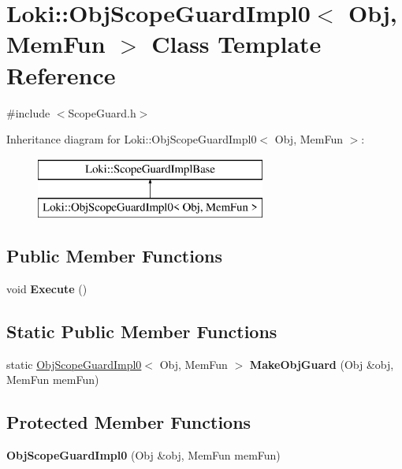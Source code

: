 \hypertarget{classLoki_1_1ObjScopeGuardImpl0}{}\section{Loki\+:\+:Obj\+Scope\+Guard\+Impl0$<$ Obj, Mem\+Fun $>$ Class Template Reference}
\label{classLoki_1_1ObjScopeGuardImpl0}


{\ttfamily \#include $<$Scope\+Guard.\+h$>$}

Inheritance diagram for Loki\+:\+:Obj\+Scope\+Guard\+Impl0$<$ Obj, Mem\+Fun $>$\+:\begin{figure}[H]
\begin{center}
\leavevmode
\includegraphics[height=2.000000cm]{classLoki_1_1ObjScopeGuardImpl0}
\end{center}
\end{figure}
\subsection*{Public Member Functions}
\begin{DoxyCompactItemize}
\item 
\hypertarget{classLoki_1_1ObjScopeGuardImpl0_ad7a3b5f77f3e70a2e7d266f08f9394f4}{}void {\bfseries Execute} ()\label{classLoki_1_1ObjScopeGuardImpl0_ad7a3b5f77f3e70a2e7d266f08f9394f4}

\end{DoxyCompactItemize}
\subsection*{Static Public Member Functions}
\begin{DoxyCompactItemize}
\item 
\hypertarget{classLoki_1_1ObjScopeGuardImpl0_aa498b03668c0b7f421dd893fc1480271}{}static \hyperlink{classLoki_1_1ObjScopeGuardImpl0}{Obj\+Scope\+Guard\+Impl0}$<$ Obj, Mem\+Fun $>$ {\bfseries Make\+Obj\+Guard} (Obj \&obj, Mem\+Fun mem\+Fun)\label{classLoki_1_1ObjScopeGuardImpl0_aa498b03668c0b7f421dd893fc1480271}

\end{DoxyCompactItemize}
\subsection*{Protected Member Functions}
\begin{DoxyCompactItemize}
\item 
\hypertarget{classLoki_1_1ObjScopeGuardImpl0_a6d15a1d2b50dcba96a1f2397c88fd2cc}{}{\bfseries Obj\+Scope\+Guard\+Impl0} (Obj \&obj, Mem\+Fun mem\+Fun)\label{classLoki_1_1ObjScopeGuardImpl0_a6d15a1d2b50dcba96a1f2397c88fd2cc}

\end{DoxyCompactItemize}

